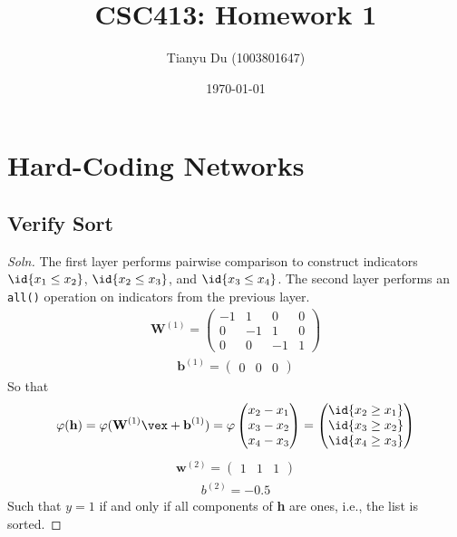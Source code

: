\documentclass{article}
\title{CSC413: Homework 1}
\date{\today}
\author{Tianyu Du (1003801647)}
\begin{document}
    \maketitle
    \section{Hard-Coding Networks}
    \subsection{Verify Sort}
    \begin{proof}[Soln]
    	The first layer performs pairwise comparison to construct indicators $\id{x_1 \leq x_2}$, $\id{x_2 \leq x_3}$, and $\id{x_3 \leq x_4}$. The second layer performs an \texttt{all()} operation on indicators from the previous layer.
    	\begin{align}
    		\textbf{W}^{(1)} = 
    		\begin{pmatrix}
    			-1 & 1 & 0 & 0 \\
    			0 & -1 & 1 & 0 \\
    			0 & 0 & -1 & 1
    		\end{pmatrix}
    	\end{align}
    	\begin{align}
    		\textbf{b}^{(1)} = 
    		\begin{pmatrix}
    			0 & 0 & 0
    		\end{pmatrix}
    	\end{align}
    	So that 
    	\begin{align}
    		\varphi(\textbf{h}) = \varphi(\textbf{W}^{(1)} \vex + \textbf{b}^{(1)}) =
    		\varphi \begin{pmatrix}
    			x_2 - x_1 \\
    			x_3 - x_2 \\
    			x_4 - x_3
    		\end{pmatrix} =
    		\begin{pmatrix}
    			\id{x_2 \geq x_1} \\
    			\id{x_3 \geq x_2} \\
    			\id{x_4 \geq x_3}
    		\end{pmatrix}
    	\end{align}
    	\begin{align}
    		\textbf{w}^{(2)} = 
    		\begin{pmatrix}
    			1 & 1 & 1
    		\end{pmatrix}
    	\end{align}
    	\begin{align}
    		b^{(2)} = - 0.5
    	\end{align}
    	Such that $y = 1$ if and only if all components of \textbf{h} are ones, i.e., the list is sorted.
    \end{proof}
\end{document}
